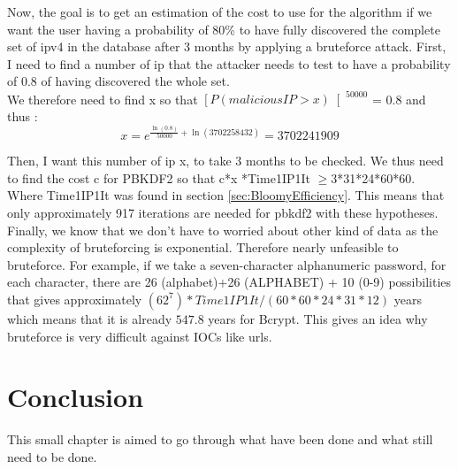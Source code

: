 \documentclass{eplmastersthesis}
\begin{document}
Now, the goal is to get an estimation of the cost to use for the algorithm if we want the user having a probability of 80\% to have fully discovered the complete set of \gls{ipv4} in the database after 3 months by applying a bruteforce attack.
First, I need to find a number of \gls{ip} that the attacker needs to test to have a probability of 0.8 of having discovered the whole set.\\

We therefore need to find x so that $\left[ P(malicious IP > x)\right[^50000$ = 0.8 and thus :
$$x = e^{\frac{\ln(0.8)}{50000} + \ln(3 702 258 432)} = 3702241909$$

Then, I want this number of \gls{ip} x, to take 3 months to be checked. We thus need to find the cost c for PBKDF2 so that c*x *Time1IP1It $\geq$3*31*24*60*60. Where Time1IP1It was found in section \ref{sec:BloomyEfficiency}. This means that only approximately 917 iterations are needed for \gls{pbkdf2} with these hypotheses.\\

Finally, we know that we don't have to worried about other kind of data as the complexity of bruteforcing is exponential.
Therefore nearly unfeasible to bruteforce. For example, if we take a seven-character alphanumeric password, for each character, there are 26 (alphabet)+26 (ALPHABET) + 10 (0-9) possibilities that gives approximately $(62^7)*Time1IP1It/(60*60*24*31*12)$ years which means that it is already $547.8$ years for Bcrypt.
This gives an idea why bruteforce is very difficult against IOCs like \gls{url}s.\\ 

\chapter{Conclusion}

This small chapter is aimed to go through what have been done and what still need to be done.
\end{document}
